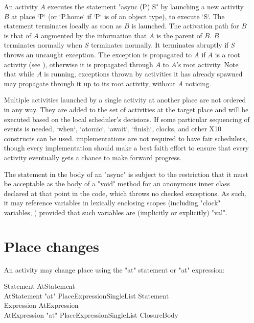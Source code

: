 An activity $A$ executes the statement \xcd"async (P) S" by launching
a new activity $B$ at place \xcd`P` (or \xcd`P.home` if \xcd`P` is of an
object type), to execute \xcd`S`. The statement terminates locally as soon as $B$ is
launched.  The activation path for $B$ is that of $A$ augmented by the
information that {$A$} is the parent of {$B$}. 
$B$
terminates normally when $S$ terminates normally.  It terminates
abruptly if $S$ throws an uncaught exception. The exception is
propagated to $A$ if $A$ is a root activity (see ),
otherwise it is propagated through $A$ to $A$'s root activity. Note that while
{$A$} is running, exceptions thrown by activities it has already
spawned may propagate through it up to its root activity, without {$A$} noticing.

Multiple activities launched by a single activity at another place are not
ordered in any way. They are added to the set of activities at the target
place and will be executed based on the local scheduler's decisions.
If some particular sequencing of events is needed, \xcd`when`, \xcd`atomic`,
\xcd`await`, \xcd`finish`, clocks, and other X10 constructs can be used.
\Xten{} implementations are not required to have fair schedulers,
though every implementation should make a best faith effort to ensure
that every activity eventually gets a chance to make forward progress.

\begin{staticrule*}
The statement in the body of an \xcd"async" is subject to the
restriction that it must be acceptable as the body of a \xcd"void"
method for an anonymous inner class declared at that point in the code,
which throws no checked exceptions. As such, it may reference
variables in lexically enclosing scopes (including \xcd"clock"
variables, ) provided that such variables are
(implicitly or explicitly) \xcd"val".
\end{staticrule*}

\section{Place changes}\label{AtStatement}

An activity may change place using the \xcd"at" statement or
\xcd"at" expression:

\begin{grammar}
Statement \: AtStatement \\
AtStatement \: \xcd"at" PlaceExpressionSingleList Statement \\
Expression \: AtExpression \\
AtExpression \: \xcd"at" PlaceExpressionSingleList ClosureBody 
\end{grammar}

